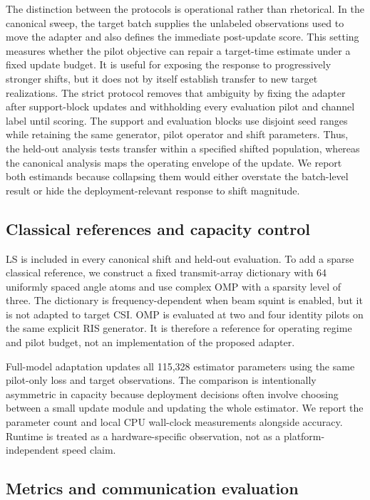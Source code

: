 \documentclass[10pt,twocolumn]{article}
\begin{document}
The distinction between the protocols is operational rather than rhetorical. In the
canonical sweep, the target batch supplies the unlabeled observations used to move
the adapter and also defines the immediate post-update score. This setting measures
whether the pilot objective can repair a target-time estimate under a fixed update
budget. It is useful for exposing the response to progressively stronger shifts,
but it does not by itself establish transfer to new target realizations. The strict
protocol removes that ambiguity by fixing the adapter after support-block updates
and withholding every evaluation pilot and channel label until scoring. The support
and evaluation blocks use disjoint seed ranges while retaining the same generator,
pilot operator and shift parameters. Thus, the held-out analysis tests transfer
within a specified shifted population, whereas the canonical analysis maps the
operating envelope of the update. We report both estimands because collapsing them
would either overstate the batch-level result or hide the deployment-relevant
response to shift magnitude.

\subsection{Classical references and capacity control}

LS is included in every canonical shift and held-out evaluation. To add a sparse classical reference, we construct a fixed transmit-array dictionary with 64 uniformly spaced angle atoms and use complex OMP with a sparsity level of three. The dictionary is frequency-dependent when beam squint is enabled, but it is not adapted to target CSI. OMP is evaluated at two and four identity pilots on the same explicit RIS generator. It is therefore a reference for operating regime and pilot budget, not an implementation of the proposed adapter.

Full-model adaptation updates all 115,328 estimator parameters using the same pilot-only loss and target observations. The comparison is intentionally asymmetric in capacity because deployment decisions often involve choosing between a small update module and updating the whole estimator. We report the parameter count and local CPU wall-clock measurements alongside accuracy. Runtime is treated as a hardware-specific observation, not as a platform-independent speed claim.

\subsection{Metrics and communication evaluation}
\end{document}
